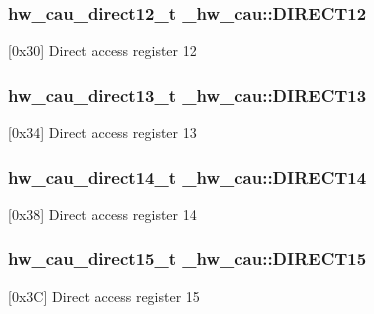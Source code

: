 \subsubsection[{\texorpdfstring{D\+I\+R\+E\+C\+T12}{DIRECT12}}]{ {\bf hw\+\_\+cau\+\_\+direct12\+\_\+t} \+\_\+hw\+\_\+cau\+::\+D\+I\+R\+E\+C\+T12}\hypertarget{struct__hw__cau_a7accd0a93d54a6a9761740082aab5609}{}\label{struct__hw__cau_a7accd0a93d54a6a9761740082aab5609}
\mbox{[}0x30\mbox{]} Direct access register 12 
\subsubsection[{\texorpdfstring{D\+I\+R\+E\+C\+T13}{DIRECT13}}]{ {\bf hw\+\_\+cau\+\_\+direct13\+\_\+t} \+\_\+hw\+\_\+cau\+::\+D\+I\+R\+E\+C\+T13}\hypertarget{struct__hw__cau_a14cdb2110b401788e723505695382b65}{}\label{struct__hw__cau_a14cdb2110b401788e723505695382b65}
\mbox{[}0x34\mbox{]} Direct access register 13 
\subsubsection[{\texorpdfstring{D\+I\+R\+E\+C\+T14}{DIRECT14}}]{ {\bf hw\+\_\+cau\+\_\+direct14\+\_\+t} \+\_\+hw\+\_\+cau\+::\+D\+I\+R\+E\+C\+T14}\hypertarget{struct__hw__cau_abe0c5ecef424211b435902042555e792}{}\label{struct__hw__cau_abe0c5ecef424211b435902042555e792}
\mbox{[}0x38\mbox{]} Direct access register 14 
\subsubsection[{\texorpdfstring{D\+I\+R\+E\+C\+T15}{DIRECT15}}]{ {\bf hw\+\_\+cau\+\_\+direct15\+\_\+t} \+\_\+hw\+\_\+cau\+::\+D\+I\+R\+E\+C\+T15}\hypertarget{struct__hw__cau_a4f6384146ac1efdec4a07014dbdc2149}{}\label{struct__hw__cau_a4f6384146ac1efdec4a07014dbdc2149}
\mbox{[}0x3C\mbox{]} Direct access register 15 
